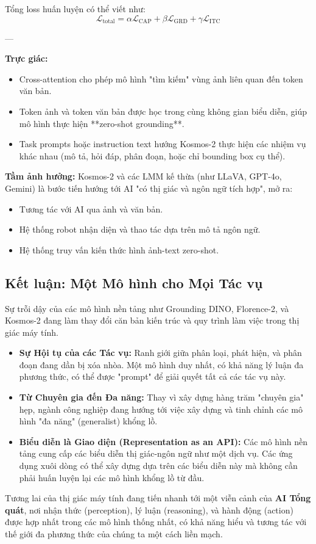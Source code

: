 Tổng loss huấn luyện có thể viết như:
\[
\mathcal{L}_\text{total} = \alpha \mathcal{L}_\text{CAP} + \beta \mathcal{L}_\text{GRD} + \gamma \mathcal{L}_\text{ITC}
\]

---

\textbf{Trực giác:}  
\begin{itemize}
	\item Cross-attention cho phép mô hình "tìm kiếm" vùng ảnh liên quan đến token văn bản.
	\item Token ảnh và token văn bản được học trong cùng không gian biểu diễn, giúp mô hình thực hiện **zero-shot grounding**.
	\item Task prompts hoặc instruction text hướng Kosmos-2 thực hiện các nhiệm vụ khác nhau (mô tả, hỏi đáp, phân đoạn, hoặc chỉ bounding box cụ thể).
\end{itemize}

\textbf{Tầm ảnh hưởng:}  
Kosmos-2 và các LMM kế thừa (như LLaVA, GPT-4o, Gemini) là bước tiến hướng tới AI "có thị giác và ngôn ngữ tích hợp", mở ra:
\begin{itemize}
	\item Tương tác với AI qua ảnh và văn bản.
	\item Hệ thống robot nhận diện và thao tác dựa trên mô tả ngôn ngữ.
	\item Hệ thống truy vấn kiến thức hình ảnh-text zero-shot.
\end{itemize}

\subsection{Kết luận: Một Mô hình cho Mọi Tác vụ}
\label{subsec:foundation_models_conclusion}
Sự trỗi dậy của các mô hình nền tảng như Grounding DINO, Florence-2, và Kosmos-2 đang làm thay đổi căn bản kiến trúc và quy trình làm việc trong thị giác máy tính.
\begin{itemize}
	\item \textbf{Sự Hội tụ của các Tác vụ:} Ranh giới giữa phân loại, phát hiện, và phân đoạn đang dần bị xóa nhòa. Một mô hình duy nhất, có khả năng lý luận đa phương thức, có thể được "prompt" để giải quyết tất cả các tác vụ này.
	\item \textbf{Từ Chuyên gia đến Đa năng:} Thay vì xây dựng hàng trăm "chuyên gia" hẹp, ngành công nghiệp đang hướng tới việc xây dựng và tinh chỉnh các mô hình "đa năng" (generalist) khổng lồ.
	\item \textbf{Biểu diễn là Giao diện (Representation as an API):} Các mô hình nền tảng cung cấp các biểu diễn thị giác-ngôn ngữ như một dịch vụ. Các ứng dụng xuôi dòng có thể xây dựng dựa trên các biểu diễn này mà không cần phải huấn luyện lại các mô hình khổng lồ từ đầu.
\end{itemize}
Tương lai của thị giác máy tính đang tiến nhanh tới một viễn cảnh của \textbf{AI Tổng quát}, nơi nhận thức (perception), lý luận (reasoning), và hành động (action) được hợp nhất trong các mô hình thống nhất, có khả năng hiểu và tương tác với thế giới đa phương thức của chúng ta một cách liền mạch.

